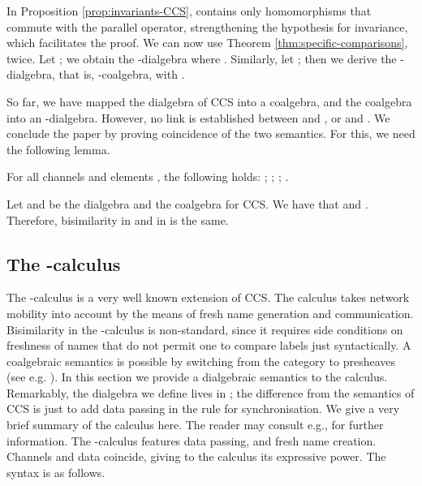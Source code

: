 \documentclass[orivec]{llncs}
\begin{document}
In Proposition \ref{prop:invariants-CCS},  contains only homomorphisms that commute with the parallel operator, strengthening the hypothesis for invariance, which facilitates the proof.
We can now use Theorem \ref{thm:specific-comparisons}, twice. Let ; we obtain the -dialgebra  where . Similarly, let ; then we derive the -dialgebra, that is, -coalgebra,  with .

\medskip

So far, we have mapped the dialgebra of CCS into a coalgebra, and the coalgebra into an -dialgebra. However, no link is established between  and , or  and  . We conclude the paper by proving coincidence of the two semantics. For this, we need the following lemma. 

\begin{lemma}\label{lem:transition-reaction}
	For all channels  and elements , the following holds:
; 
; 
; 
. 
\end{lemma}

\begin{proposition}\label{pro:equal}
	Let  and  be the dialgebra and the coalgebra for CCS. We have that  and . Therefore, bisimilarity in  and in  is the same.
\end{proposition}


\subsection{The -calculus}



The -calculus \cite{mpw92} is a very well known extension of CCS. The calculus takes network mobility into account by the means of fresh name generation and communication. Bisimilarity in the -calculus is non-standard, since it requires side conditions on freshness of names that do not permit one to compare labels just syntactically. A coalgebraic semantics is possible by switching from the category  to presheaves (see e.g. \cite{ft99}). In this section we provide a dialgebraic semantics to the calculus. Remarkably, the dialgebra we define lives in ; the difference from the semantics of CCS is just to add data passing in the rule for synchronisation.
We give a very brief summary of the calculus here. The reader may consult e.g., \cite{San01} for further information. The -calculus features data passing, and fresh name creation. Channels and data coincide, giving to the calculus its expressive power. The syntax is as follows.
\end{document}
